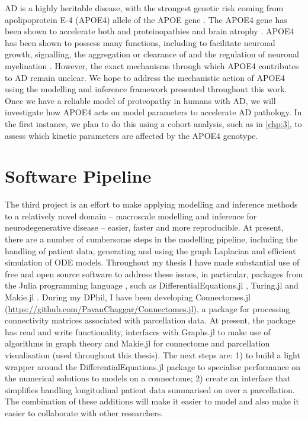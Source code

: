AD is a highly heritable disease, with the strongest genetic risk coming from
apolipoprotein E-4 (APOE4) allele of the APOE gene \cite{corder1993gene,
lambert2013meta}. The APOE4 gene has been shown to accelerate both \AB and \TP
proteinopathies and brain atrophy \cite{liu2017apoe4, shi2017apoe4}. APOE4 has
been shown to possess many functions, including to facilitate neuronal growth,
signalling, the aggregation or clearance of \AB and the regulation of neuronal
myelination \cite{hunsberger2019role, kanekiyo2014apoe, blanchard2022apoe4}.
However, the exact mechanisms through which APOE4 contributes to AD remain
unclear. We hope to address the mechanistic action of APOE4 using the modelling
and inference framework presented throughout this work. Once we have a reliable
model of proteopathy in humans with AD, we will investigate how APOE4 acts on
model parameters to accelerate AD pathology. In the first instance, we plan to
do this using a cohort analysis, such as in \cref{chp:3}, to assess which
kinetic parameters are affected by the APOE4 genotype.

\section{Software Pipeline}
\label{sec:5-software}

The third project is an effort to make applying modelling and inference methods
to a relatively novel domain -- macroscale modelling and inference for
neurodegenerative disease -- easier, faster and more reproducible. At present,
there are a number of cumbersome steps in the modelling pipeline, including the
handling of patient data, generating and using the graph Laplacian and efficient
simulation of ODE models. Throughout my thesis I have made substantial use of
free and open source software to address these issues, in particular, packages
from the Julia programming language \cite{bezanson2012julia}, such as
DifferentialEquations.jl \cite{rackauckas2017differentialequations}, Turing.jl
\cite{tarek2020dynamicppl} and Makie.jl \cite{DanischKrumbiegel2021}. During my
DPhil, I have been developing Connectomes.jl
(\url{https://github.com/PavanChaggar/Connectomes.jl}), a package for processing
connectivity matrices associated with parcellation data. At present, the package
has read and write functionality, interfaces with Graphs.jl
\cite{fairbanks2021juliagraphs} to make use of algorithms in graph theory and
Makie.jl \cite{DanischKrumbiegel2021} for connectome and parcellation
visualisation (used throughout this thesis). The next steps are: 1) to build a
light wrapper around the DifferentialEquations.jl
\cite{rackauckas2017differentialequations} package to specialise performance on
the numerical solutions to models on a connectome; 2) create an interface that
simplifies handling longitudinal patient data summarised on over a parcellation.
The combination of these additions will make it easier to model and also make it
easier to collaborate with other researchers. 

